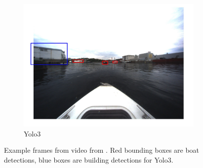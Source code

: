 \begin{figure}[h!]
\begin{subfigure}[b]{0.6\textwidth}
   \includegraphics[width=1\linewidth]{results/kamsvag/yolo3_figure_1479.jpg}
   \caption{Yolo3}
\end{subfigure}
\caption{Example frames from video from \citep{Kamsvag2018}. Red bounding boxes are boat detections, blue boxes are building detections for Yolo3.}
\label{fig:kamsvaag_vid}
\end{figure}

